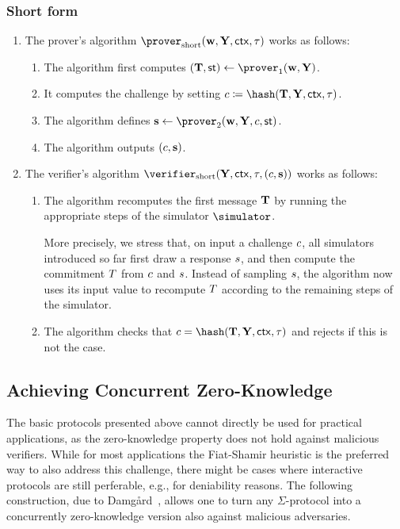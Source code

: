\documentclass[runningheads]{llncs}
\begin{document}
\subsubsection{Short form}
\begin{enumerate}
  \item
    The prover's algorithm $\shortprover(\vec \witness, \vec \statement,\ctx, \stag)$ works as follows:
    \begin{enumerate}
      \item
        The algorithm first computes $(\vec \commitment,\st)\gets\prover_1(\vec \witness, \vec \statement)$.
      \item
        It computes the challenge by setting $c\defeq\hash(\vec \commitment, \vec \statement,\ctx, \stag)$.
      \item
        The algorithm defines $\vec \response\gets\prover_2(\vec \witness,\vec \statement, \challenge,\st)$.
      \item
        The algorithm outputs $(c,\mathbf {s})$.
    \end{enumerate}
  \item
    The verifier's algorithm $\shortverifier(\vec \statement, \ctx, \stag, (\challenge, \vec \response))$ works as follows:
    \begin{enumerate}
      \item\label{item:fslong:v:recomputet}
        The algorithm recomputes the first message $\mathbf {T}$ by running the appropriate steps of the simulator $\simulator$.
        
         More precisely, we stress that, on input a challenge $c$, all simulators introduced so far first draw a response $s$, and then compute the commitment $T$ from $c$ and $s$.
        Instead of sampling $s$, the algorithm now uses its input value to recompute $T$ according to the remaining steps of the simulator.
        \item
        The algorithm checks that $c=\hash(\vec \commitment, \vec \statement, \ctx, \tau)$ and rejects if this is not the case.
    \end{enumerate}
\end{enumerate}




\subsection{Achieving Concurrent Zero-Knowledge}\label{sec:concurrent}
The basic protocols presented above cannot directly be used for practical applications, as the zero-knowledge property does not hold against malicious verifiers.
While for most applications the Fiat-Shamir heuristic is the preferred way to also address this challenge, there might be cases where interactive protocols are still perferable, e.g., for deniability reasons.
The following construction, due to Damg\r{a}rd~\cite{EC:Damgard00}, allows one to turn any $\Sigma$-protocol into a concurrently zero-knowledge version also against malicious adversaries.
\end{document}
